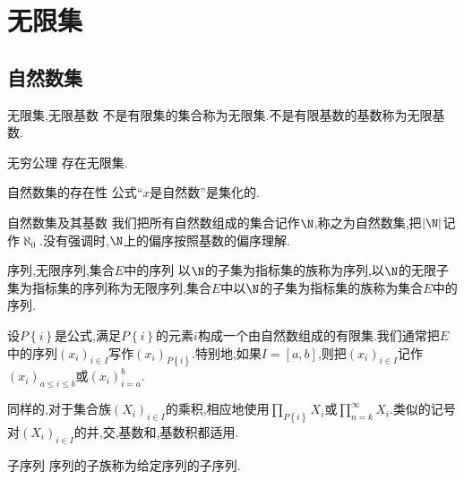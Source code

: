 \chapter{无限集}

\section{自然数集}

\begin{definition}{无限集,无限基数}{}
	不是有限集的集合称为无限集.不是有限基数的基数称为无限基数.
\end{definition}

\begin{axiom}{无穷公理}{}
	存在无限集.
\end{axiom}

\begin{theorem}{自然数集的存在性}{}
	公式``$x$是自然数''是集化的.
\end{theorem}

\begin{definition}{自然数集及其基数}{}
	我们把所有自然数组成的集合记作$\N$,称之为自然数集,把$\left|\N\right|$记作$\aleph_{0}$.没有强调时,$\N$上的偏序按照基数的偏序理解.
\end{definition}

\begin{definition}{序列,无限序列,集合$E$中的序列}{}
	以$\N$的子集为指标集的族称为序列,以$\N$的无限子集为指标集的序列称为无限序列,集合$E$中以$\N$的子集为指标集的族称为集合$E$中的序列.
\end{definition}

\begin{convention}{}{}
	设$P\left\{i\right\}$是公式,满足$P\left\{i\right\}$的元素$i$构成一个由自然数组成的有限集.我们通常把$E$中的序列$\left(x_{i}\right)_{i\in I}$写作$\left(x_{i}\right)_{P\left\{i\right\}}$.特别地,如果$I=\left[a,b\right]$,则把$\left(x_{i}\right)_{i\in I}$记作$\left(x_{i}\right)_{a\leq i\leq b}$或$\left(x_{i}\right)_{i=a}^{b}$.
	
	同样的,对于集合族$\left(X_{i}\right)_{i\in I}$的乘积,相应地使用$\prod\limits_{P\left\{i\right\}}X_{i}$或$\prod\limits_{n=k}^{\infty}X_{i}$.类似的记号对$\left(X_{i}\right)_{i\in I}$的并,交,基数和,基数积都适用.
\end{convention}

\begin{definition}{子序列}{}
	序列的子族称为给定序列的子序列.
\end{definition}

